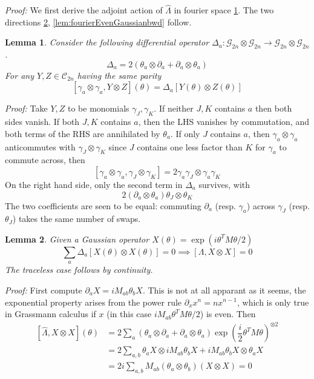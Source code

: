 \documentclass[
]{book}
\newtheorem{lemma}{Lemma}[chapter]
\theoremstyle{definition}
\theoremstyle{definition}
\theoremstyle{definition}
\theoremstyle{definition}
\theoremstyle{remark}
\begin{document}
\emph{Proof:} We first derive the adjoint action of \(\hat \Lambda\) in fourier space
\ref{lem:adjointLambda}.
The two directions \ref{lem:fourierEvenGaussianfwd},
\ref{lem:fourierEvenGaussianbwd} follow.

\begin{lemma}
\protect\hypertarget{lem:adjointLambda}{}\label{lem:adjointLambda}Consider the following differential operator
\(\Delta_a:\mathcal G_{2n}\otimes \mathcal G_{2n}\to \mathcal G_{2n}\otimes \mathcal G_{2n}\).
\[ 
    \Delta_a = 2(\theta_a\otimes \partial_{a} + \partial_{a} \otimes \theta_a)
\]
For any \(Y, Z\in \mathcal C_{2n}\) having the same parity
\[  
    [\gamma_a\otimes \gamma_a, Y\otimes Z](\theta) = \Delta_a[Y(\theta)\otimes Z(\theta)]
\]
\end{lemma}

\emph{Proof:} Take \(Y, Z\) to be monomials \(\gamma_J, \gamma_K\).
If neither \(J, K\) contains \(a\) then both sides vanish.
If both \(J, K\) contains \(a\), then the LHS vanishes by commutation,
and both terms of the RHS are annihilated by \(\theta_a\).
If only \(J\) contains \(a\), then \(\gamma_a\otimes \gamma_a\) anticommutes with
\(\gamma_J\otimes \gamma_K\) since \(J\) contains one less factor than \(K\) for \(\gamma_a\)
to commute across, then
\[ 
    [\gamma_a\otimes \gamma_a, \gamma_J\otimes \gamma_K] 
    = 2 \gamma_a \gamma_J \otimes \gamma_a \gamma_K 
\]
On the right hand side, only the second term in \(\Delta_a\) survives, with
\[ 
    2 (\partial_{a} \otimes \theta_a) \theta_J \otimes \theta_K 
\]
The two coefficients are seen to be equal: commuting \(\partial_{a}\) (resp. \(\gamma_a\))
across \(\gamma_J\) (resp. \(\theta_J\)) takes the same number of swaps.

\begin{lemma}
\protect\hypertarget{lem:fourierEvenGaussianfwd}{}\label{lem:fourierEvenGaussianfwd}Given a Gaussian operator \(X(\theta)=\exp(i\theta^TM\theta/2)\)
\[ 
    \sum_a \Delta_a[X(\theta)\otimes X(\theta)]=0\implies [\Lambda, X\otimes X] = 0 
\]
The traceless case follows by continuity.
\end{lemma}

\emph{Proof:} First compute \(\partial_{a} X = i M_{ab}\theta_b X\). This is not at all
apparant as it seems, the exponential property arises from the power rule
\(\partial_{x} x^n = nx^{n-1}\), which is only true in Grassmann calculus if
\(x\) (in this case \(iM_{ab}\theta^TM\theta/2\)) is even. Then
\begin{equation}\begin{aligned}
\left[\hat \Lambda, X\otimes X\right](\theta)
&= 2\sum_a \left(\theta_a \otimes \partial_{a} + \partial_{a} \otimes \theta_a \right)
\exp\left(\dfrac i 2 \theta^T M \theta\right)^{\otimes 2} \\ 
&= 2\sum_{a, b} \theta_a X \otimes iM_{ab} \theta_b X + iM_{ab} \theta_b X \otimes \theta_a X  \\ 
&= 2 i \sum_{a, b} M_{ab} (\theta_a \otimes \theta_b) (X\otimes X) = 0
\end{aligned}\end{equation}
\end{document}
